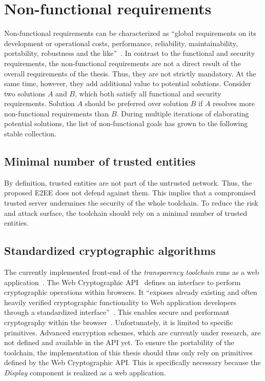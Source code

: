 \documentclass[../main.tex]{subfiles}
\begin{document}
\section{Non-functional requirements}\label{non-functional-requriements}
Non-functional requirements can be characterized as \enquote{global requirements on its development or operational costs, performance, reliability, maintainability, portability, robustness and the like}~\cite[11]{Mylopoulos1992}.
In contrast to the functional and security requirements, the non-functional requirements are not a direct result of the overall requirements of the thesis.
Thus, they are not strictly mandatory.
At the same time, however, they add additional value to potential solutions.
Consider two solutions $A$ and $B$, which both satisfy all functional and security requirements.
Solution $A$ should be preferred over solution $B$ if $A$ resolves more non-functional requirements than $B$.
During multiple iterations of elaborating potential solutions, the list of non-functional goals has grown to the following stable collection.

\subsection{Minimal number of trusted entities}
By definition, trusted entities are not part of the untrusted network. 
Thus, the proposed E2EE does not defend against them.
This implies that a compromised trusted server undermines the security of the whole toolchain.
To reduce the risk and attack surface, the toolchain should rely on a minimal number of trusted entities.

\subsection{Standardized cryptographic algorithms}
The currently implemented front-end of the \emph{transparency toolchain} runs as a web application~\cite{Zieglmeier2021}. 
The Web Cryptographic API~\cite{WebCryptoApi2017} defines an interface to perform cryptographic operations within browsers. 
It \enquote{exposes already existing and often heavily verified cryptographic functionality to Web application developers through a standardized interface}~\cite[959]{Halpin2014}.
This enables secure and performant cryptography within the browser~\cite{Halpin2014}.
Unfortunately, it is limited to specific primitives. 
Advanced encryption schemes, which are currently under research, are not defined and available in the API yet.
To ensure the portability of the toolchain, the implementation of this thesis should thus only rely on primitives defined by the Web Cryptographic API.
This is specifically necessary because the \emph{Display} component is realized as a web application.
\end{document}
